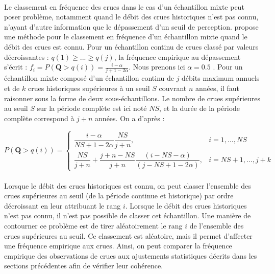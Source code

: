 \documentclass[11pt]{article}
\begin{document}
		\paragraph{} Le classement en fréquence des crues dans le cas d'un échantillon mixte peut poser problème, notamment quand le débit des crues historiques n'est pas connu, n'ayant d'autre information que le dépassement d'un seuil de perception. \citet{hirsch_probability_1987} propose une méthode pour le classement en fréquence d'un échantillon mixte quand le débit des crues est connu. Pour un échantillon continu de crues classé par valeurs décroissantes : $q(1) \geq ... \geq q(j)$, la fréquence empirique au dépassement s'écrit : $f_i = P(\boldsymbol{Q} > q(i)) = \frac{i-\alpha}{j+1-2\alpha}$. Nous prenons ici $\alpha = 0.5$ \citep{hazen_storage_1914}. Pour un échantillon mixte composé d'un échantillon continu de $j$ débits maximum annuels et de $k$ crues historiques supérieures à un seuil $S$ couvrant $n$ années, il faut raisonner sous la forme de deux sous-échantillons. Le nombre de crues supérieures au seuil $S$ sur la période complète est ici noté $NS$, et la durée de la période complète correspond à $j + n$ années. On a d'après \citet{hirsch_probability_1987} :
		
		\begin{equation}	
		P(\boldsymbol{Q} > q(i)) = \begin{cases}\dfrac{i-\alpha}{NS+1-2 \alpha} \dfrac{NS}{j+n}, & i=1, \ldots, NS \\ \dfrac{NS}{j+n}+\dfrac{j+n-NS}{j+n} \dfrac{(i-NS-\alpha)}{(j-NS+1-2\alpha)}, & i=NS+1, \ldots, j+k\end{cases}
		\label{eq:FreqHisto}	
		\end{equation}
%	
%		
	
	\paragraph{} Lorsque le débit des crues historiques est connu, on peut classer l'ensemble des crues supérieures au seuil (de la période continue et historique) par ordre décroissant en leur attribuant le rang $i$. Lorsque le débit des crues historiques n'est pas connu, il n'est pas possible de classer cet échantillon. Une manière de contourner ce problème est de tirer aléatoirement le rang $i$ de l'ensemble des crues supérieures au seuil. Ce classement est aléatoire, mais il permet d'affecter une fréquence empirique aux crues. Ainsi, on peut comparer la fréquence empirique des observations de crues aux ajustements statistiques décrits dans les sections précédentes afin de vérifier leur cohérence. 
		
\end{document}

